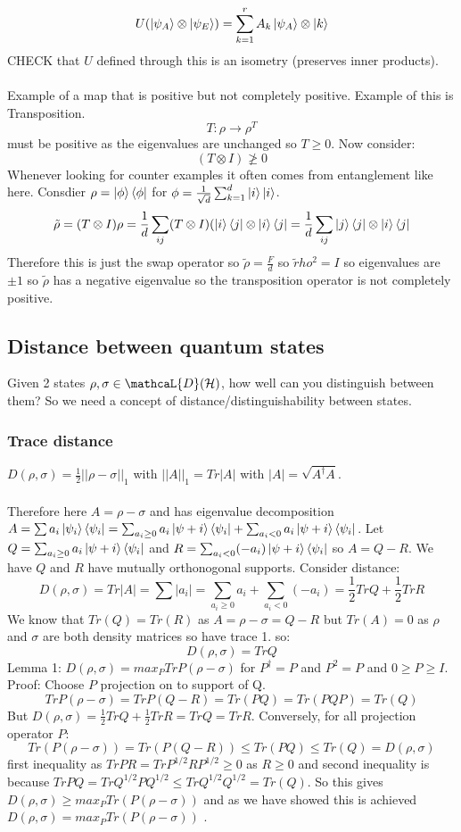 \documentclass{article}
\begin{document}
$$
U(\ket{\psi_A}\otimes \ket{\psi_E} ) = \sum_{k=1}^r A_k \ket{\psi_A} \otimes \ket{k}
$$
CHECK that $U$ defined through this is an isometry (preserves inner products). \\\\
Example of a map that is positive but not completely positive. Example of this is Transposition.
$$
T: \rho \rightarrow \rho^T
$$
must be positive as the eigenvalues are unchanged so $T\geq 0$. Now consider:
$$
(T\otimes I) \ngeq 0 
$$
Whenever looking for counter examples it often comes from entanglement like here. Consdier $\rho = \ket{\phi}\bra{\phi}$ for $\phi = \frac{1}{\sqrt{d}} \sum_{k=1}^d \ket{i} \ket{i}$.
$$
\tilde \rho = (T \otimes I) \rho = \frac{1}{d} \sum_{ij} (T \otimes I) (\ket{i}\bra{j} \otimes \ket{i}\bra{j} = \frac{1}{d} \sum_{ij} \ket{j}\bra{j} \otimes \ket{i}\bra{j} $$
Therefore this is just the swap operator so $\tilde \rho = \frac{F}{d}$ so $\tilde rho ^2 = I$ so eigenvalues are $\pm 1$ so $\tilde \rho$ has a negative eigenvalue so the transposition operator is not completely positive.
\subsection{Distance between quantum states}
Given 2 states $\rho, \sigma \in \mathcaL{D}(\mathcal{H})$, how well can you distinguish between them? So we need a concept of distance/distinguishability between states. 
\subsubsection{Trace distance}
$D(\rho, \sigma) = \frac{1}{2} || \rho - \sigma ||_1$ with $||A||_1 = Tr |A|$ with $|A|= \sqrt{A^{\dagger}A}$.\\\\ Therefore here $A= \rho - \sigma$ and has eigenvalue decomposition $A = \sum a_i \ket{\psi_i} \bra{\psi_i} = \sum_{a_i \geq 0} a_i \ket{\psi+i} \bra{\psi_i} + \sum_{a_i < 0} a_i \ket{\psi+i} \bra{\psi_i} $. Let $Q = \sum_{a_i \geq 0} a_i \ket{\psi+i} \bra{\psi_i}$ and $R = \sum_{a_i < 0} (-a_i) \ket{\psi+i} \bra{\psi_i}$ so  $A = Q-R$. We have $Q$ and $R$ have mutually orthonogonal supports. Consider distance:
$$
D(\rho, \sigma) = Tr |A| = \sum |a_i| = \sum_{a_i\geq 0} a_i + \sum_{a_i <0} (-a_i) = \frac{1}{2} Tr Q + \frac{1}{2} Tr R
$$
We know that $Tr(Q) = Tr(R)$ as $A= \rho - \sigma= Q-R$ but $Tr(A) = 0 $ as $\rho$ and $\sigma$ are both density matrices so have trace 1. so:
$$
D(\rho, \sigma) = Tr Q
$$
Lemma 1: $D(\rho, \sigma) = max_{P} Tr P(\rho - \sigma)$ for $P^{\dagger} = P$ and $P^2 = P$ and $0 \geq P \geq I$. \\
Proof: Choose $P$ projection on to support of Q.\\
$$
Tr P(\rho- \sigma) = Tr P(Q-R) = Tr (PQ)  = Tr (PQP) = Tr (Q)
$$
But $D(\rho, \sigma ) = \frac{1}{2} Tr Q + \frac{1}{2} TrR = Tr Q = Tr R$. Conversely, for all projection operator $P$:
$$
Tr( P(\rho - \sigma)) = Tr(P(Q-R)) \leq Tr(PQ) \leq Tr(Q) = D(\rho, \sigma)
$$
first inequality as $Tr PR = Tr P^{1/2}R P^{1/2} \geq 0$ as $R \geq 0$ and second inequality is because $Tr PQ = Tr Q^{1/2}P Q^{1/2} \leq Tr Q^{1/2}Q^{1/2} = Tr(Q)$.
So this gives $D(\rho, \sigma) \geq max_{P} Tr(P(\rho- \sigma))$ and as we have showed this is achieved $D(\rho, \sigma) = max_{P} Tr(P(\rho- \sigma))$ .
\end{document}
